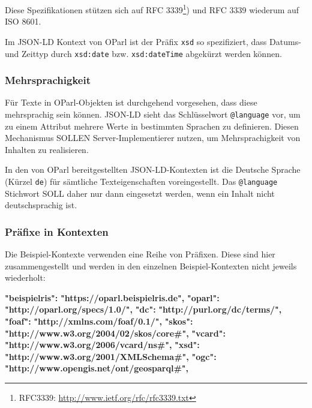 \documentclass[,a4paper]{article}
\newenvironment{Shaded}{}{}
\newcommand{\ErrorTok}[1]{\textcolor[rgb]{1.00,0.00,0.00}{\textbf{{#1}}}}
\begin{document}
Diese Spezifikationen stützen sich auf RFC 3339\footnote{RFC3339:
  \url{http://www.ietf.org/rfc/rfc3339.txt}}) und RFC 3339 wiederum auf
ISO 8601.

Im JSON-LD Kontext von OParl ist der Präfix \texttt{xsd} so
spezifiziert, dass Datums- und Zeittyp durch \texttt{xsd:date} bzw.
\texttt{xsd:dateTime} abgekürzt werden können.

\subsubsection{Mehrsprachigkeit}\label{mehrsprachigkeit}

Für Texte in OParl-Objekten ist durchgehend vorgesehen, dass diese
mehrsprachig sein können. JSON-LD sieht das Schlüsselwort
\texttt{@language} vor, um zu einem Attribut mehrere Werte in bestimmten
Sprachen zu definieren. Diesen Mechanismus SOLLEN Server-Implementierer
nutzen, um Mehrsprachigkeit von Inhalten zu realisieren.

In den von OParl bereitgestellten JSON-LD-Kontexten ist die Deutsche
Sprache (Kürzel \texttt{de}) für sämtliche Texteigenschaften
voreingestellt. Das \texttt{@language} Stichwort SOLL daher nur dann
eingesetzt werden, wenn ein Inhalt nicht deutschsprachig ist.

\subsubsection{Präfixe in Kontexten}\label{pruxe4fixe-in-kontexten}

Die Beispiel-Kontexte verwenden eine Reihe von Präfixen. Diese sind hier
zusammengestellt und werden in den einzelnen Beispiel-Kontexten nicht
jeweils wiederholt:

\begin{Shaded}
\begin{Highlighting}[]
    \ErrorTok{"beispielris":} \ErrorTok{"https://oparl.beispielris.de",}
    \ErrorTok{"oparl":} \ErrorTok{"http://oparl.org/specs/1.0/",}
    \ErrorTok{"dc":} \ErrorTok{"http://purl.org/dc/terms/",}
    \ErrorTok{"foaf":} \ErrorTok{"http://xmlns.com/foaf/0.1/",}
    \ErrorTok{"skos":} \ErrorTok{"http://www.w3.org/2004/02/skos/core#",}
    \ErrorTok{"vcard":} \ErrorTok{"http://www.w3.org/2006/vcard/ns#",}
    \ErrorTok{"xsd":} \ErrorTok{"http://www.w3.org/2001/XMLSchema#",}
    \ErrorTok{"ogc":} \ErrorTok{"http://www.opengis.net/ont/geosparql#",}
\end{Highlighting}
\end{Shaded}
\end{document}
